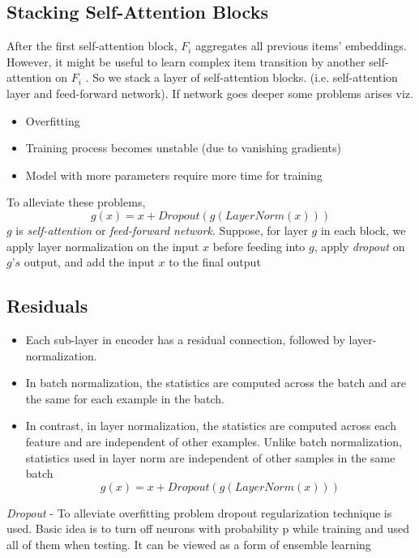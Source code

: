 \documentclass[11pt]{article}
\begin{document}
\subsection{Stacking Self-Attention Blocks}
After the first self-attention block, $F_{i}$ aggregates all previous items’ embeddings. However, it might be useful to learn complex item transition by another self-attention on $F_{i}$ . So we stack a layer of self-attention blocks. (i.e. self-attention layer and feed-forward network).
If network goes deeper some problems arises viz.
\begin{itemize}
	\item Overfitting
	\item Training process becomes unstable (due to vanishing gradients)
	\item Model with more parameters require more time for training
\end{itemize}
To alleviate these problems,
            	  \[g(x) = x + Dropout(g(LayerNorm(x)))\]	
 	$g$ is \textit{self-attention} or \textit{feed-forward network}.
           	Suppose, for layer $g$ in each block, we apply layer normalization on the input $x$ before feeding into $g$, apply \textit{dropout} on $g’s$ output, and add the input $x$ to the final output

\subsection{Residuals}
	\begin{itemize}
		\item Each sub-layer in encoder has a residual connection, followed by layer-normalization.
		\item In batch normalization, the statistics are computed across the batch and are the same for each example in the batch.
		\item In contrast, in layer normalization, the statistics are computed across each feature and are independent of other examples. Unlike batch normalization, statistics used in layer norm are independent of other samples in the same batch
			\[ g(x) = x + Dropout(g(LayerNorm(x))) \]
	\end{itemize}  
\quad \emph{Dropout} - 
            	To alleviate overfitting problem dropout regularization technique is used. Basic idea is to turn off neurons with probability p while training and used all of them when testing. It can be viewed as a form of ensemble learning
\end{document}
